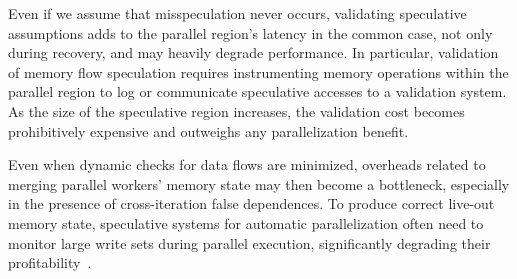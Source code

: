 Even if we assume that misspeculation never occurs, validating speculative
assumptions adds to the parallel region's latency in the common case, not only
during recovery, and may heavily degrade performance.
%
In particular, validation of memory flow speculation requires instrumenting
memory operations within the parallel region to log or communicate speculative
accesses to a validation system. As the size of the speculative region
increases, the validation cost becomes prohibitively expensive and outweighs any
parallelization benefit.
%

Even when dynamic checks for data flows are minimized, overheads related to
merging parallel workers' memory state
may then become a bottleneck,
%
especially in the presence of cross-iteration false dependences.
%
To produce correct live-out memory state, speculative systems for automatic
parallelization often need to monitor large write sets during parallel
execution, significantly degrading their profitability~\cite{johnson:12:pldi}.
%
%
%
%

%
%

